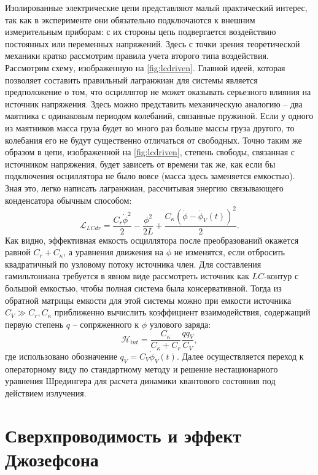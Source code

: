 \documentclass[14pt, a4paper]{extreport}
\numberwithin{equation}{section}
\begin{document}
Изолированные электрические цепи представляют малый практический интерес, так как в эксперименте они обязательно подключаются к внешним измерительным приборам: с их стороны цепь подвергается воздействию постоянных или переменных напряжений. Здесь с точки зрения теоретической механики кратко рассмотрим правила учета второго типа воздействия. Рассмотрим схему, изображенную на \autoref{fig:lcdriven}. Главной идеей, которая позволяет составить правильный лагранжиан для системы является предположение о том, что осциллятор не может оказывать серьезного влияния на источник напряжения. Здесь можно представить механическую аналогию -- два маятника с одинаковым периодом колебаний, связанные пружиной. Если у одного из маятников масса груза будет во много раз больше массы груза другого, то колебания его не будут существенно отличаться от свободных. Точно таким же образом в цепи, изображенной на \autoref{fig:lcdriven}, степень свободы, связанная с источником напряжения, будет зависеть от времени так же, как если бы подключения осциллятора не было вовсе (масса здесь заменяется емкостью). Зная это, легко написать лагранжиан, рассчитывая энергию связывающего конденсатора обычным способом:
\begin{equation}
	\mathcal{L}_{{LCdr}} =\frac{C_r \dot\phi^2}{2} - \frac{\phi^2}{2L} + \frac{C_\kappa (\dot\phi - \dot\phi_V(t))^2}{2}.
\end{equation} 
Как видно, эффективная емкость осциллятора после преобразований окажется равной $C_r + C_\kappa$, а уравнения движения на $\phi$ не изменятся, если отбросить квадратичный по узловому потоку источника член. Для составления гамильтониана требуется в явном виде рассмотреть источник как $LC$-контур с большой емкостью, чтобы полная система была консервативной. Тогда из обратной матрицы емкости для этой системы можно при емкости источника $C_V \gg C_r, C_\kappa$ приближенно вычислить коэффициент взаимодействия, содержащий первую степень $q$ -- сопряженного к $\phi$ узлового заряда:
\begin{equation}
	\mathcal{H}_{int} = \frac{C_\kappa}{C_\kappa + C_r} \frac{q q_V}{C_V},
\end{equation}
где использовано обозначение $q_V = C_V \dot\phi_V(t)$. Далее осуществляется переход к операторному виду по стандартному методу и решение нестационарного уравнения Шредингера для расчета динамики квантового состояния под действием излучения.


\section{Сверхпроводимость и эффект Джозефсона}
\end{document}
